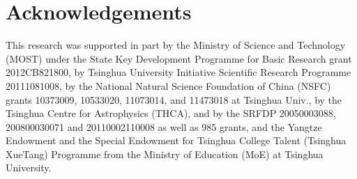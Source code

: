 \documentclass[fleqn,usenatbib]{mnras}
\begin{document}
\section*{Acknowledgements}

This research was supported in part by
 the Ministry of Science and Technology (MOST)
 under the State Key Development Programme for
 Basic Research grant 2012CB821800,
 by Tsinghua University Initiative Scientific Research
 Programme 20111081008,
 by
 the National Natural Science Foundation of China (NSFC)
 grants 10373009, 10533020, 11073014, and 11473018
 at Tsinghua Univ.,
 by the Tsinghua Centre for Astrophysics (THCA),
 and by the SRFDP 20050003088, 200800030071 and
 20110002110008 as well as 985 grants, and the
 Yangtze Endowment
 and the Special Endowment for Tsinghua
 College Talent (Tsinghua XueTang) Programme from
 the Ministry of Education (MoE) at Tsinghua University.

\vskip 1.0cm









\end{document}
